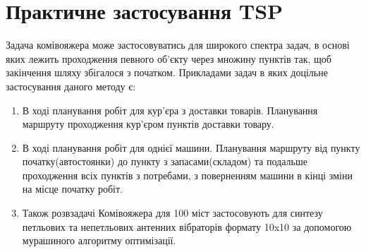 \section{Практичне застосування TSP}
Задача комівояжера може застосовуватись для широкого спектра задач, в основі яких лежить проходження певного об'єкту
через множину пунктів так, щоб закінчення шляху збігалося з початком.
Прикладами задач в яких доцільне застосування даного методу є: 
\begin{enumerate}
    \item В ході планування робіт для кур'єра з доставки товарів. Планування маршруту проходження кур'єром пунктів доставки товару.
    \item В ході планування робіт для однієї машини. Планування маршруту від пункту початку(автостоянки) до пункту з запасами(складом)
    та подальше проходження всіх пунктів з потребами, з поверненням машини в кінці зміни на місце початку робіт.
    \item Також розв задачі Комівояжера для 100 міст застосовують для
    синтезу петльових та непетльових антенних вібраторів формату 10x10 за допомогою мурашиного алгоритму оптимізації.
\end{enumerate}